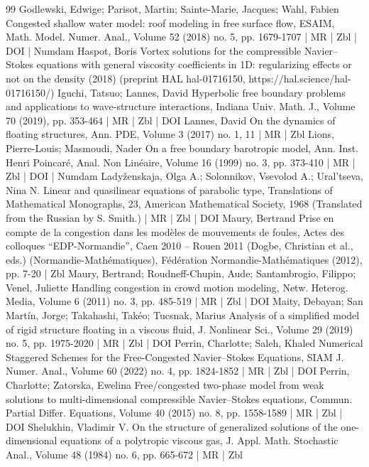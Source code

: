 \begin{thebibliography}{99}
 Godlewski, Edwige; Parisot, Martin; Sainte-Marie, Jacques; Wahl, Fabien Congested shallow water model: roof modeling in free surface flow, ESAIM, Math. Model. Numer. Anal., Volume 52 (2018) no. 5, pp. 1679-1707 | MR | Zbl | DOI | Numdam
 Haspot, Boris Vortex solutions for the compressible Navier–Stokes equations with general viscosity coefficients in 1D: regularizing effects or not on the density (2018) (preprint HAL hal-01716150, https://hal.science/hal-01716150/)
 Iguchi, Tatsuo; Lannes, David Hyperbolic free boundary problems and applications to wave-structure interactions, Indiana Univ. Math. J., Volume 70 (2019), pp. 353-464 | MR | Zbl | DOI
 Lannes, David On the dynamics of floating structures, Ann. PDE, Volume 3 (2017) no. 1, 11 | MR | Zbl
 Lions, Pierre-Louis; Masmoudi, Nader On a free boundary barotropic model, Ann. Inst. Henri Poincaré, Anal. Non Linéaire, Volume 16 (1999) no. 3, pp. 373-410 | MR | Zbl | DOI | Numdam
 Ladyženskaja, Olga A.; Solonnikov, Vsevolod A.; Ural’tseva, Nina N. Linear and quasilinear equations of parabolic type, Translations of Mathematical Monographs, 23, American Mathematical Society, 1968 (Translated from the Russian by S. Smith.) | MR | Zbl | DOI
 Maury, Bertrand Prise en compte de la congestion dans les modèles de mouvements de foules, Actes des colloques “EDP-Normandie”, Caen 2010 – Rouen 2011 (Dogbe, Christian et al., eds.) (Normandie-Mathématiques), Fédération Normandie-Mathématiques (2012), pp. 7-20 | Zbl
 Maury, Bertrand; Roudneff-Chupin, Aude; Santambrogio, Filippo; Venel, Juliette Handling congestion in crowd motion modeling, Netw. Heterog. Media, Volume 6 (2011) no. 3, pp. 485-519 | MR | Zbl | DOI
 Maity, Debayan; San Martín, Jorge; Takahashi, Takéo; Tucsnak, Marius Analysis of a simplified model of rigid structure floating in a viscous fluid, J. Nonlinear Sci., Volume 29 (2019) no. 5, pp. 1975-2020 | MR | Zbl | DOI
 Perrin, Charlotte; Saleh, Khaled Numerical Staggered Schemes for the Free-Congested Navier–Stokes Equations, SIAM J. Numer. Anal., Volume 60 (2022) no. 4, pp. 1824-1852 | MR | Zbl | DOI
 Perrin, Charlotte; Zatorska, Ewelina Free/congested two-phase model from weak solutions to multi-dimensional compressible Navier–Stokes equations, Commun. Partial Differ. Equations, Volume 40 (2015) no. 8, pp. 1558-1589 | MR | Zbl | DOI
 Shelukhin, Vladimir V. On the structure of generalized solutions of the one-dimensional equations of a polytropic viscous gas, J. Appl. Math. Stochastic Anal., Volume 48 (1984) no. 6, pp. 665-672 | MR | Zbl

\end{thebibliography}
